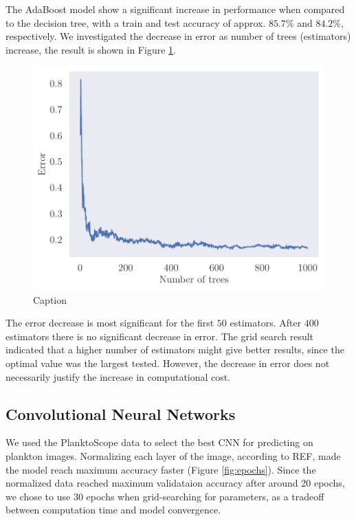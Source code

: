 The AdaBoost model show a significant increase in performance when compared to the decision tree, with a train and test accuracy of approx. $85.7\%$ and $84.2\%$, respectively. We investigated the decrease in error as number of trees (estimators) increase, the result is shown in Figure \ref{fig:be_adaboost_metadata}. 
\begin{figure}
    \centering
    \includegraphics[width=\linewidth]{latex/figures/be_adaboost_planktoscope_metadata.pdf}
    \caption{Caption}
    \label{fig:be_adaboost_metadata}
\end{figure}
The error decrease is most significant for the first $50$ estimators. After $400$ estimators there is no significant decrease in error. The grid search result indicated that a higher number of estimators might give better results, since the optimal value was the largest tested. However, the decrease in error does not necessarily justify the increase in computational cost.

\subsection{Convolutional Neural Networks}

We used the PlanktoScope data to select the best CNN for predicting on plankton images. Normalizing each layer of the image, according to REF, made the model reach maximum accuracy faster (Figure \ref{fig:epochs}). Since the normalized data reached maximum validataion accuracy after around 20 epochs, we chose to use 30 epochs when grid-searching for parameters, as a tradeoff between computation time and model convergence.

